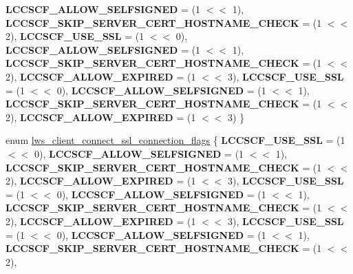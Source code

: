 \begin{DoxyCompactItemize}
{\bfseries L\+C\+C\+S\+C\+F\+\_\+\+A\+L\+L\+O\+W\+\_\+\+S\+E\+L\+F\+S\+I\+G\+N\+ED} = (1 $<$$<$ 1), 
{\bfseries L\+C\+C\+S\+C\+F\+\_\+\+S\+K\+I\+P\+\_\+\+S\+E\+R\+V\+E\+R\+\_\+\+C\+E\+R\+T\+\_\+\+H\+O\+S\+T\+N\+A\+M\+E\+\_\+\+C\+H\+E\+CK} = (1 $<$$<$ 2), 
{\bfseries L\+C\+C\+S\+C\+F\+\_\+\+U\+S\+E\+\_\+\+S\+SL} = (1 $<$$<$ 0), 
{\bfseries L\+C\+C\+S\+C\+F\+\_\+\+A\+L\+L\+O\+W\+\_\+\+S\+E\+L\+F\+S\+I\+G\+N\+ED} = (1 $<$$<$ 1), 
\newline
{\bfseries L\+C\+C\+S\+C\+F\+\_\+\+S\+K\+I\+P\+\_\+\+S\+E\+R\+V\+E\+R\+\_\+\+C\+E\+R\+T\+\_\+\+H\+O\+S\+T\+N\+A\+M\+E\+\_\+\+C\+H\+E\+CK} = (1 $<$$<$ 2), 
{\bfseries L\+C\+C\+S\+C\+F\+\_\+\+A\+L\+L\+O\+W\+\_\+\+E\+X\+P\+I\+R\+ED} = (1 $<$$<$ 3), 
{\bfseries L\+C\+C\+S\+C\+F\+\_\+\+U\+S\+E\+\_\+\+S\+SL} = (1 $<$$<$ 0), 
{\bfseries L\+C\+C\+S\+C\+F\+\_\+\+A\+L\+L\+O\+W\+\_\+\+S\+E\+L\+F\+S\+I\+G\+N\+ED} = (1 $<$$<$ 1), 
\newline
{\bfseries L\+C\+C\+S\+C\+F\+\_\+\+S\+K\+I\+P\+\_\+\+S\+E\+R\+V\+E\+R\+\_\+\+C\+E\+R\+T\+\_\+\+H\+O\+S\+T\+N\+A\+M\+E\+\_\+\+C\+H\+E\+CK} = (1 $<$$<$ 2), 
{\bfseries L\+C\+C\+S\+C\+F\+\_\+\+A\+L\+L\+O\+W\+\_\+\+E\+X\+P\+I\+R\+ED} = (1 $<$$<$ 3)
 \}
\item 
enum \hyperlink{group__client_ga96f3dbad54b2853969cfa933d66871ce}{lws\+\_\+client\+\_\+connect\+\_\+ssl\+\_\+connection\+\_\+flags} \{ \newline
{\bfseries L\+C\+C\+S\+C\+F\+\_\+\+U\+S\+E\+\_\+\+S\+SL} = (1 $<$$<$ 0), 
{\bfseries L\+C\+C\+S\+C\+F\+\_\+\+A\+L\+L\+O\+W\+\_\+\+S\+E\+L\+F\+S\+I\+G\+N\+ED} = (1 $<$$<$ 1), 
{\bfseries L\+C\+C\+S\+C\+F\+\_\+\+S\+K\+I\+P\+\_\+\+S\+E\+R\+V\+E\+R\+\_\+\+C\+E\+R\+T\+\_\+\+H\+O\+S\+T\+N\+A\+M\+E\+\_\+\+C\+H\+E\+CK} = (1 $<$$<$ 2), 
{\bfseries L\+C\+C\+S\+C\+F\+\_\+\+A\+L\+L\+O\+W\+\_\+\+E\+X\+P\+I\+R\+ED} = (1 $<$$<$ 3), 
\newline
{\bfseries L\+C\+C\+S\+C\+F\+\_\+\+U\+S\+E\+\_\+\+S\+SL} = (1 $<$$<$ 0), 
{\bfseries L\+C\+C\+S\+C\+F\+\_\+\+A\+L\+L\+O\+W\+\_\+\+S\+E\+L\+F\+S\+I\+G\+N\+ED} = (1 $<$$<$ 1), 
{\bfseries L\+C\+C\+S\+C\+F\+\_\+\+S\+K\+I\+P\+\_\+\+S\+E\+R\+V\+E\+R\+\_\+\+C\+E\+R\+T\+\_\+\+H\+O\+S\+T\+N\+A\+M\+E\+\_\+\+C\+H\+E\+CK} = (1 $<$$<$ 2), 
{\bfseries L\+C\+C\+S\+C\+F\+\_\+\+A\+L\+L\+O\+W\+\_\+\+E\+X\+P\+I\+R\+ED} = (1 $<$$<$ 3), 
\newline
{\bfseries L\+C\+C\+S\+C\+F\+\_\+\+U\+S\+E\+\_\+\+S\+SL} = (1 $<$$<$ 0), 
{\bfseries L\+C\+C\+S\+C\+F\+\_\+\+A\+L\+L\+O\+W\+\_\+\+S\+E\+L\+F\+S\+I\+G\+N\+ED} = (1 $<$$<$ 1), 
{\bfseries L\+C\+C\+S\+C\+F\+\_\+\+S\+K\+I\+P\+\_\+\+S\+E\+R\+V\+E\+R\+\_\+\+C\+E\+R\+T\+\_\+\+H\+O\+S\+T\+N\+A\+M\+E\+\_\+\+C\+H\+E\+CK} = (1 $<$$<$ 2), 
$$
\end{DoxyCompactItemize}
